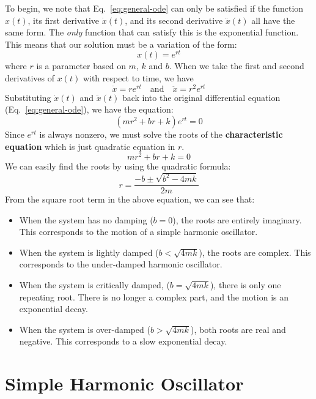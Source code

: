 To begin, we note that Eq.~\ref{eq:general-ode} can only be satisfied if the
function $x(t)$, its first derivative $\dot x(t)$, and its second derivative
$\ddot x(t)$ all have the same form. The \emph{only} function that can satisfy
this is the exponential function. This means that our solution must be a
variation of the form:
\begin{equation}
  x(t)=e^{rt}
\end{equation}
where $r$ is a parameter based on $m$, $k$ and $b$. When we take the first and
second derivatives of $x(t)$ with respect to time, we have
\begin{equation*}
  \dot x=re^{rt}\quad\text{and}\quad\ddot x=r^2e^{rt}
\end{equation*}
Substituting $\dot x(t)$ and $\ddot x(t)$ back into the original differential
equation (Eq.~\ref{eq:general-ode}), we have the equation:
\begin{equation}
  (mr^2+br+k)e^{rt}=0
\end{equation}
Since $e^{rt}$ is always nonzero, we must solve the roots of the
\textbf{characteristic equation} which is just quadratic equation in $r$.
\begin{equation}
  mr^2+br+k=0
\end{equation}
We can easily find the roots by using the quadratic formula:
\begin{equation}
  r=\frac{-b\pm\sqrt{b^2-4mk}}{2m}
\end{equation}
From the square root term in the above equation, we can see that:
\begin{itemize}[itemsep=6pt]
\item When the system has no damping ($b=0$), the roots are entirely imaginary.
  This corresponds to the motion of a simple harmonic oscillator.
\item When the system is lightly damped ($b<\sqrt{4mk}$), the
  roots are complex. This corresponds to the under-damped harmonic oscillator.
\item When the system is critically damped, ($b=\sqrt{4mk}$), there is only one
  repeating root. There is no longer a complex part, and the motion is an
  exponential decay.
\item When the system is over-damped ($b>\sqrt{4mk}$), both roots are real and
  negative. This corresponds to a slow exponential decay.
\end{itemize}



\section{Simple Harmonic Oscillator}

